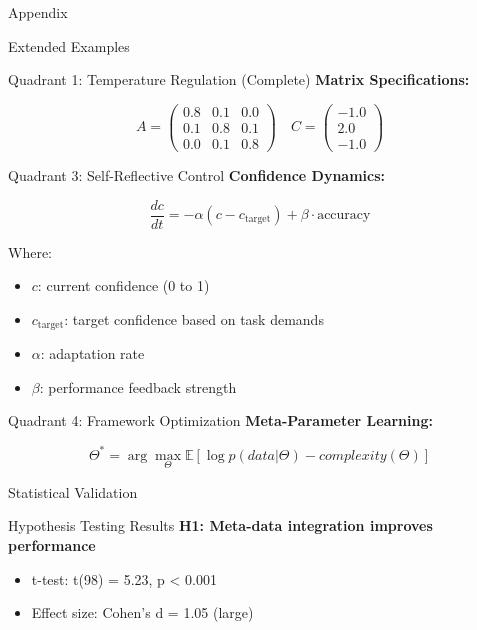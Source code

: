 \documentclass[
  ignorenonframetext,
]{beamer}
\providecommand{\tightlist}{%
  \setlength{\itemsep}{0pt}\setlength{\parskip}{0pt}}
\begin{document}
\begin{frame}[fragile]{Appendix}
\begin{block}{Extended Examples}
\begin{block}{Quadrant 1: Temperature Regulation (Complete)}
\textbf{Matrix Specifications:}

\[A = \begin{pmatrix}
0.8 & 0.1 & 0.0 \\
0.1 & 0.8 & 0.1 \\
0.0 & 0.1 & 0.8
\end{pmatrix} \quad C = \begin{pmatrix} -1.0 \\ 2.0 \\ -1.0 \end{pmatrix}\]
\end{block}

\begin{block}{Quadrant 3: Self-Reflective Control}
\protect{}\label{quadrant-3-self-reflective-control}
\textbf{Confidence Dynamics:}

\[\frac{dc}{dt} = -\alpha (c - c_{\text{target}}) + \beta \cdot \text{accuracy}\]

Where:

\begin{itemize}
\tightlist
\item
  \(c\): current confidence (0 to 1)
\item
  \(c_{\text{target}}\): target confidence based on task demands
\item
  \(\alpha\): adaptation rate
\item
  \(\beta\): performance feedback strength
\end{itemize}
\end{block}

\begin{block}{Quadrant 4: Framework Optimization}
\protect{}\label{quadrant-4-framework-optimization}
\textbf{Meta-Parameter Learning:}

\[\Theta^* = \arg\max_{\Theta} \mathbb{E}[\log p(data|\Theta) - complexity(\Theta)]\]
\end{block}
\end{block}

\begin{block}{Statistical Validation}
\protect{}\label{sec:validation_results}
\begin{block}{Hypothesis Testing Results}
\protect{}\label{hypothesis-testing-results}
\textbf{H1: Meta-data integration improves performance}

\begin{itemize}
\tightlist
\item
  t-test: t(98) = 5.23, p \textless{} 0.001
\item
  Effect size: Cohen's d = 1.05 (large)
\end{itemize}


\end{block}
\end{block}
\end{frame}
\end{document}
